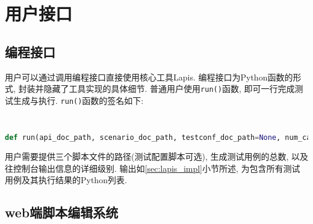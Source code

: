 	\section{用户接口}
		\subsection{编程接口}
            \label{sec:program_interface}
            用户可以通过调用编程接口直接使用核心工具Lapis. 编程接口为Python函数的形式, 封装并隐藏了工具实现的具体细节. 普通用户使用\texttt{run()}函数, 即可一行完成测试生成与执行. \texttt{run()}函数的签名如下:
            \begin{flushleft}
                \scriptsize
                \tt
                \begin{lstlisting}[language=python]
def run(api_doc_path, scenario_doc_path, testconf_doc_path=None, num_case=1, verbose=0)
                \end{lstlisting}
            \end{flushleft}
            用户需要提供三个脚本文件的路径(测试配置脚本可选), 生成测试用例的总数, 以及往控制台输出信息的详细级别. 输出如\ref{sec:lapis_impl}小节所述, 为包含所有测试用例及其执行结果的Python列表.
            
		\subsection{web端脚本编辑系统}



